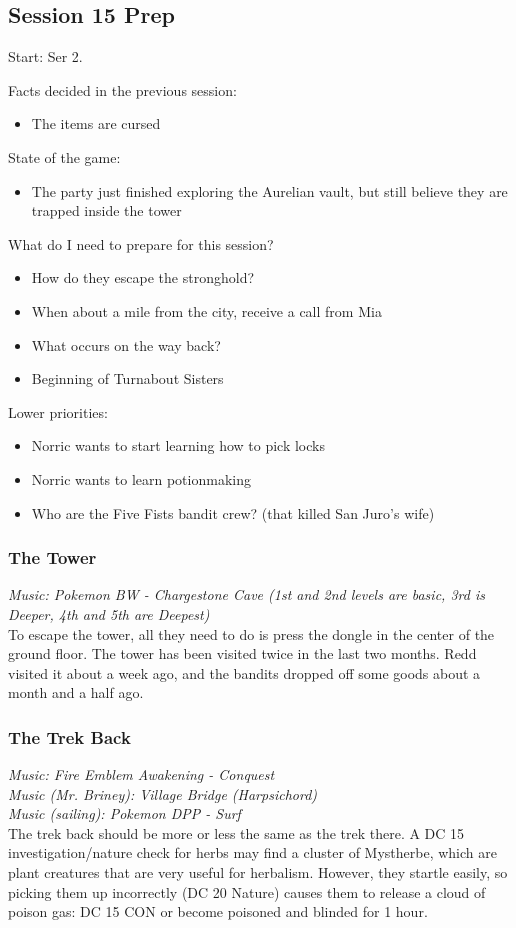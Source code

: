 \subsection{Session 15 Prep}
Start: Ser 2.

Facts decided in the previous session:
\begin{itemize}
\item The items are cursed
\end{itemize}

State of the game:
\begin{itemize}
\item The party just finished exploring the Aurelian vault, but still believe they are trapped inside the tower
\end{itemize}

What do I need to prepare for this session?
\begin{itemize}
\item How do they escape the stronghold?
\item When about a mile from the city, receive a call from Mia
\item What occurs on the way back?
\item Beginning of Turnabout Sisters
\end{itemize}

Lower priorities:
\begin{itemize}
\item Norric wants to start learning how to pick locks
\item Norric wants to learn potionmaking
\item Who are the Five Fists bandit crew? (that killed San Juro's wife)
\end{itemize}


\subsubsection{The Tower}
\textit{Music: Pokemon BW - Chargestone Cave (1st and 2nd levels are basic, 3rd is Deeper, 4th and 5th are Deepest)}\\

To escape the tower, all they need to do is press the dongle in the center of the ground floor. The tower has been visited twice in the last two months. Redd visited it about a week ago, and the bandits dropped off some goods about a month and a half ago. 

\subsubsection{The Trek Back}
\textit{Music: Fire Emblem Awakening - Conquest}\\
\textit{Music (Mr. Briney): Village Bridge (Harpsichord)}\\
\textit{Music (sailing): Pokemon DPP - Surf}\\
The trek back should be more or less the same as the trek there. A DC 15 investigation/nature check for herbs may find a cluster of Mystherbe, which are plant creatures that are very useful for herbalism. However, they startle easily, so picking them up incorrectly (DC 20 Nature) causes them to release a cloud of poison gas: DC 15 CON or become poisoned and blinded for 1 hour.

